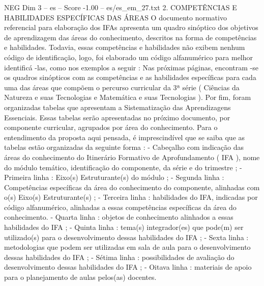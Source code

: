 \begin{textsample}{NEG Dim 3 – es – Score -1.00 – es/es\_em\_27.txt}  \label{ex:f3_neg_176}
2.
COMPETÊNCIAS E HABILIDADES ESPECÍFICAS DAS ÁREAS O documento normativo referencial para elaboração dos IFAs apresenta um quadro sinóptico dos objetivos de aprendizagem das áreas do conhecimento, descritos na forma de competências e habilidades.
Todavia, essas competências e habilidades não exibem nenhum código de identificação, logo, foi elaborado um código alfanumérico para melhor identificá -las, como nos exemplos a seguir : Nas próximas páginas, encontram -se os quadros sinópticos com as competências e as habilidades específicas para cada uma das áreas que compõem o percurso curricular da 3ª série ( Ciências da Natureza e suas Tecnologias e Matemática e suas Tecnologias ).
Por fim, foram organizadas tabelas que apresentam a Sistematização das Aprendizagens Essenciais.
Essas tabelas serão apresentadas no próximo documento, por componente curricular, agrupados por área do conhecimento.
Para o entendimento da proposta aqui pensada, é imprescindível que se saiba que as tabelas estão organizadas da seguinte forma : - Cabeçalho com indicação das áreas do conhecimento do Itinerário Formativo de Aprofundamento ( IFA ), nome do módulo temático, identificação do componente, da série e do trimestre ; - Primeira linha : Eixo(s) Estruturante(s) do módulo ; - Segunda linha : Competências específicas da área do conhecimento do componente, alinhadas com o(s) Eixo(s) Estruturante(s) ; - Terceira linha : habilidades do IFA, indicadas por código alfanumérico, alinhadas a essas competências específicas da área do conhecimento. - Quarta linha : objetos de conhecimento alinhados a essas habilidades do IFA ; - Quinta linha : tema(s) integrador(es) que pode(m) ser utilizado(s) para o desenvolvimento dessas habilidades do IFA ; - Sexta linha : metodologias que podem ser utilizadas em sala de aula para o desenvolvimento dessas habilidades do IFA ; - Sétima linha : possibilidades de avaliação do desenvolvimento dessas habilidades do IFA ; - Oitava linha : materiais de apoio para o planejamento de aulas pelos(as) docentes.

\end{textsample}
